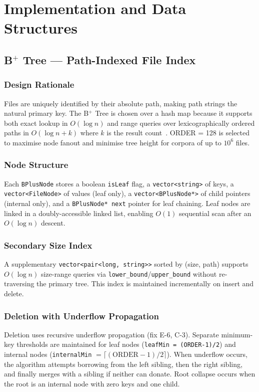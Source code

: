 \documentclass[conference]{IEEEtran}
\begin{document}
\section{Implementation and Data Structures}
\label{sec:impl}

\subsection{B$^+$ Tree — Path-Indexed File Index}

\subsubsection{Design Rationale}
Files are uniquely identified by their absolute path, making path strings the natural primary key. The B$^+$ Tree is chosen over a hash map because it supports both exact lookup in $O(\log n)$ and range queries over lexicographically ordered paths in $O(\log n + k)$ where $k$ is the result count~\cite{comer1979ubiquitous}. ORDER = 128 is selected to maximise node fanout and minimise tree height for corpora of up to $10^6$ files.

\subsubsection{Node Structure}
Each \texttt{BPlusNode} stores a boolean \texttt{isLeaf} flag, a \texttt{vector<string>} of keys, a \texttt{vector<FileNode>} of values (leaf only), a \texttt{vector<BPlusNode*>} of child pointers (internal only), and a \texttt{BPlusNode* next} pointer for leaf chaining. Leaf nodes are linked in a doubly-accessible linked list, enabling $O(1)$ sequential scan after an $O(\log n)$ descent.

\subsubsection{Secondary Size Index}
A supplementary \texttt{vector<pair<long, string>>} sorted by (size, path) supports $O(\log n)$ size-range queries via \texttt{lower\_bound}/\texttt{upper\_bound} without re-traversing the primary tree. This index is maintained incrementally on insert and delete.

\subsubsection{Deletion with Underflow Propagation}
Deletion uses recursive underflow propagation (fix E-6, C-3). Separate minimum-key thresholds are maintained for leaf nodes (\texttt{leafMin = (ORDER-1)/2}) and internal nodes (\texttt{internalMin} $= \lceil(\text{ORDER}-1)/2\rceil$). When underflow occurs, the algorithm attempts borrowing from the left sibling, then the right sibling, and finally merges with a sibling if neither can donate. Root collapse occurs when the root is an internal node with zero keys and one child.
\end{document}

